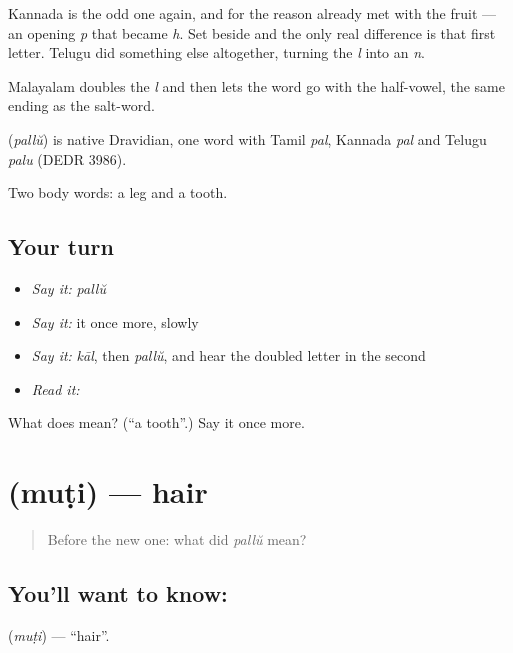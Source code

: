 Kannada is the odd one again, and for the reason already met with the fruit — an opening \emph{p} that became \emph{h}. Set  beside  and the only real difference is that first letter. Telugu did something else altogether, turning the \emph{l} into an \emph{n}.

Malayalam doubles the \emph{l} and then lets the word go with the half-vowel, the same ending as the salt-word.

\begin{cousinweb}
\textbf{} (\emph{pallŭ}) is native Dravidian, one word with Tamil \emph{pal}, Kannada \emph{pal} and Telugu \emph{palu} (DEDR 3986).
\end{cousinweb}

\begin{grammarlens}[title={What you've built}]
Two body words: a leg and a tooth.
\end{grammarlens}

\subsection*{Your turn}
\begin{itemize}
\raggedright
  \item \emph{Say it:} \emph{pallŭ}
  \item \emph{Say it:} it once more, slowly
  \item \emph{Say it:} \emph{kāl}, then \emph{pallŭ}, and hear the doubled letter in the second
  \item \emph{Read it:} \textbf{}
\end{itemize}

\begin{tcolorbox}[breakable,colback=teal!4,colframe=teal!35!black,title={Before you move on}]
What does  mean? (\textquotedblleft{}a tooth\textquotedblright{}.) Say it once more.
\end{tcolorbox}
\section[\texorpdfstring{\ml{മുടി} (muṭi)}{മുടി (muṭi)}]{ (muṭi) — hair}

\label{lesson:ML-C47-hair}



\begin{quote}
Before the new one: what did \emph{pallŭ} mean?
\end{quote}

\subsection*{You'll want to know: }
\textbf{} (\emph{muṭi}) — \textquotedblleft{}hair\textquotedblright{}.


